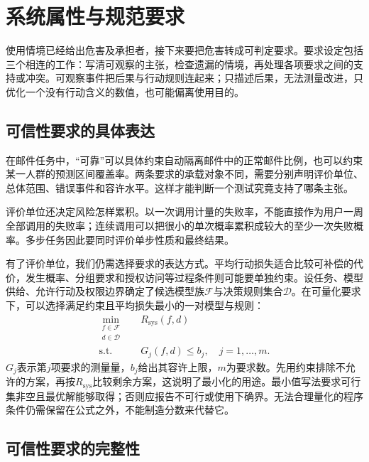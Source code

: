 \section{系统属性与规范要求}
\label{sec:trust-requirements}

使用情境已经给出危害及承担者，接下来要把危害转成可判定要求。要求设定包括三个相连的工作：写清可观察的主张，检查遗漏的情境，再处理各项要求之间的支持或冲突。可观察事件把后果与行动规则连起来；只描述后果，无法测量改进，只优化一个没有行动含义的数值，也可能偏离使用目的。

\subsection{可信性要求的具体表达}

在邮件任务中，“可靠”可以具体约束自动隔离邮件中的正常邮件比例，也可以约束某一人群的预测区间覆盖率。两条要求的承载对象不同，需要分别声明评价单位、总体范围、错误事件和容许水平。这样才能判断一个测试究竟支持了哪条主张。

评价单位还决定风险怎样累积。以一次调用计量的失败率，不能直接作为用户一周全部调用的失败率；连续调用可以把很小的单次概率累积成较大的至少一次失败概率。多步任务因此要同时评价单步性质和最终结果。

有了评价单位，我们仍需选择要求的表达方式。平均行动损失适合比较可补偿的代价，发生概率、分组要求和授权访问等过程条件则可能要单独约束。设任务、模型供给、允许行动及权限边界确定了候选模型族$\mathcal F$与决策规则集合$\mathcal D$。在可量化要求下，可以选择满足约束且平均损失最小的一对模型与规则：
\begin{equation}
 \begin{aligned}
  \min_{\substack{f\in\mathcal F\\d\in\mathcal D}}\quad
  &R_{\mathrm{sys}}(f,d)\\
  \text{s.t.}\quad
  &G_j(f,d)\leq b_j,\quad j=1,\ldots,m.
 \end{aligned}
 \label{eq:trust-constrained-objective}
\end{equation}
$G_j$表示第$j$项要求的测量量，$b_j$给出其容许上限，$m$为要求数。先用约束排除不允许的方案，再按$R_{\mathrm{sys}}$比较剩余方案，这说明了最小化的用途。最小值写法要求可行集非空且最优解能够取得；否则应报告不可行或使用下确界。无法合理量化的程序条件仍需保留在公式之外，不能制造分数来代替它。

\subsection{可信性要求的完整性}

